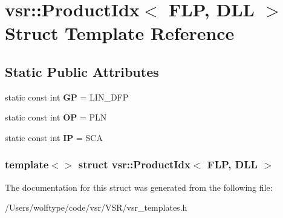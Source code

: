 \hypertarget{structvsr_1_1_product_idx_3_01_f_l_p_00_01_d_l_l_01_4}{\section{vsr\-:\-:Product\-Idx$<$ F\-L\-P, D\-L\-L $>$ Struct Template Reference}
\label{structvsr_1_1_product_idx_3_01_f_l_p_00_01_d_l_l_01_4}
}
\subsection*{Static Public Attributes}
\begin{DoxyCompactItemize}
\item 
\hypertarget{structvsr_1_1_product_idx_3_01_f_l_p_00_01_d_l_l_01_4_afeedc3612bc75d27dbd982e10304beac}{static const int {\bfseries G\-P} = L\-I\-N\-\_\-\-D\-F\-P}\label{structvsr_1_1_product_idx_3_01_f_l_p_00_01_d_l_l_01_4_afeedc3612bc75d27dbd982e10304beac}

\item 
\hypertarget{structvsr_1_1_product_idx_3_01_f_l_p_00_01_d_l_l_01_4_a13d78dddc672cc41c1c4b95dd13e71cb}{static const int {\bfseries O\-P} = P\-L\-N}\label{structvsr_1_1_product_idx_3_01_f_l_p_00_01_d_l_l_01_4_a13d78dddc672cc41c1c4b95dd13e71cb}

\item 
\hypertarget{structvsr_1_1_product_idx_3_01_f_l_p_00_01_d_l_l_01_4_a52fb4e3a204b9fa2222c231b2d6e9e12}{static const int {\bfseries I\-P} = S\-C\-A}\label{structvsr_1_1_product_idx_3_01_f_l_p_00_01_d_l_l_01_4_a52fb4e3a204b9fa2222c231b2d6e9e12}

\end{DoxyCompactItemize}
\subsubsection*{template$<$$>$ struct vsr\-::\-Product\-Idx$<$ F\-L\-P, D\-L\-L $>$}



The documentation for this struct was generated from the following file\-:\begin{DoxyCompactItemize}
\item 
/\-Users/wolftype/code/vsr/\-V\-S\-R/vsr\-\_\-templates.\-h\end{DoxyCompactItemize}
